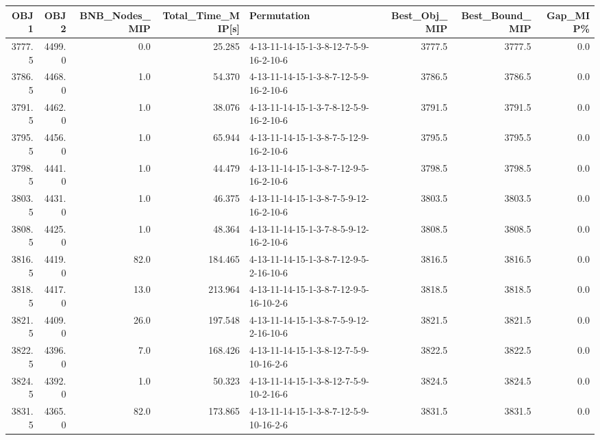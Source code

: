 \begin{tabular}{rrrrlrrr}
\toprule
   OBJ1 &    OBJ2 &  BNB\_Nodes\_MIP &  Total\_Time\_MIP[s] &                             Permutation &  Best\_Obj\_MIP &  Best\_Bound\_MIP &  Gap\_MIP\% \\
\midrule
 3777.5 &  4499.0 &            0.0 &             25.285 &  4-13-11-14-15-1-3-8-12-7-5-9-16-2-10-6 &        3777.5 &          3777.5 &       0.0 \\
 3786.5 &  4468.0 &            1.0 &             54.370 &  4-13-11-14-15-1-3-8-7-12-5-9-16-2-10-6 &        3786.5 &          3786.5 &       0.0 \\
 3791.5 &  4462.0 &            1.0 &             38.076 &  4-13-11-14-15-1-3-7-8-12-5-9-16-2-10-6 &        3791.5 &          3791.5 &       0.0 \\
 3795.5 &  4456.0 &            1.0 &             65.944 &  4-13-11-14-15-1-3-8-7-5-12-9-16-2-10-6 &        3795.5 &          3795.5 &       0.0 \\
 3798.5 &  4441.0 &            1.0 &             44.479 &  4-13-11-14-15-1-3-8-7-12-9-5-16-2-10-6 &        3798.5 &          3798.5 &       0.0 \\
 3803.5 &  4431.0 &            1.0 &             46.375 &  4-13-11-14-15-1-3-8-7-5-9-12-16-2-10-6 &        3803.5 &          3803.5 &       0.0 \\
 3808.5 &  4425.0 &            1.0 &             48.364 &  4-13-11-14-15-1-3-7-8-5-9-12-16-2-10-6 &        3808.5 &          3808.5 &       0.0 \\
 3816.5 &  4419.0 &           82.0 &            184.465 &  4-13-11-14-15-1-3-8-7-12-9-5-2-16-10-6 &        3816.5 &          3816.5 &       0.0 \\
 3818.5 &  4417.0 &           13.0 &            213.964 &  4-13-11-14-15-1-3-8-7-12-9-5-16-10-2-6 &        3818.5 &          3818.5 &       0.0 \\
 3821.5 &  4409.0 &           26.0 &            197.548 &  4-13-11-14-15-1-3-8-7-5-9-12-2-16-10-6 &        3821.5 &          3821.5 &       0.0 \\
 3822.5 &  4396.0 &            7.0 &            168.426 &  4-13-11-14-15-1-3-8-12-7-5-9-10-16-2-6 &        3822.5 &          3822.5 &       0.0 \\
 3824.5 &  4392.0 &            1.0 &             50.323 &  4-13-11-14-15-1-3-8-12-7-5-9-10-2-16-6 &        3824.5 &          3824.5 &       0.0 \\
 3831.5 &  4365.0 &           82.0 &            173.865 &  4-13-11-14-15-1-3-8-7-12-5-9-10-16-2-6 &        3831.5 &          3831.5 &       0.0 \\

\end{tabular}
